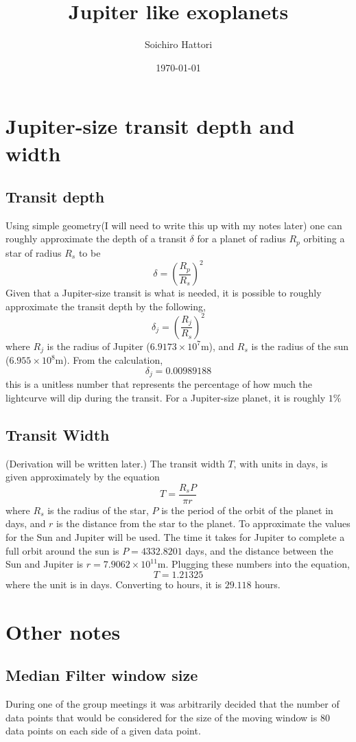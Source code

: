 \documentclass[a4paper]{article}
\title{Jupiter like exoplanets}
\author{Soichiro Hattori}
\date{\today}
\begin{document}
\maketitle

\section{Jupiter-size transit depth and width}
\subsection{Transit depth}
Using simple geometry(I will need to write this up with my notes later) one can roughly approximate the depth of a transit $\delta$ for a planet of radius $R_p$ orbiting a star of radius $R_s$ to be $$\delta=(\frac{R_p}{R_s})^2$$
Given that a Jupiter-size transit is what is needed, it is possible to roughly approximate the transit depth by the following, $$\delta_j=(\frac{R_j}{R_s})^2$$ where $R_j$ is the radius of Jupiter ($6.9173\times10^7$m), and $R_s$ is the radius of the sun ($6.955\times10^8$m). From the calculation, $$\delta_j=0.00989188$$
this is a unitless number that represents the percentage of how much the lightcurve will dip during the transit. For a Jupiter-size planet, it is roughly $1\%$

\subsection{Transit Width}
(Derivation will be written later.)
The transit width $T$, with units in days, is given approximately by the equation $$T=\frac{R_sP}{\pi r}$$ where $R_s$ is the radius of the star, $P$ is the period of the orbit of the planet in days, and $r$ is the distance from the star to the planet. To approximate the values for the Sun and Jupiter will be used. The time it takes for Jupiter to complete a full orbit around the sun is $P=4332.8201$ days, and the distance between the Sun and Jupiter is $r=7.9062\times10^{11}$m. Plugging these numbers into the equation,  $$T=1.21325$$ where the unit is in days. Converting to hours, it is $29.118$ hours.
\section{Other notes}
\subsection{Median Filter window size}
During one of the group meetings it was arbitrarily decided that the number of data points that would be considered for the size of the moving window is 80 data points on each side of a given data point. 
\end{document}
